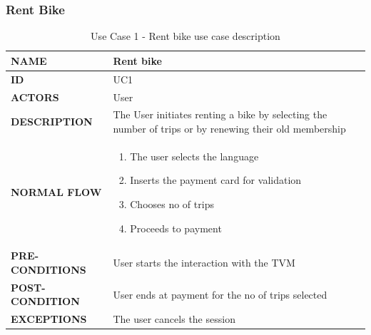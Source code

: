 \subsubsection{Rent Bike}
\begin{table}[H]
\begin{center}
\renewcommand{\arraystretch}{2}
\begin{tabular}{|p{8cm}|p{8cm}| } 
 \hline
 \textbf{NAME} & Rent bike\\ 
 \hline
 \textbf{ID} & UC1  \\ 
 \hline
 \textbf{ACTORS} & User\\ 
 \hline
 \textbf{DESCRIPTION} & The User initiates renting a bike by selecting the number of trips or by renewing their old membership \\ 
 \hline
 \textbf{NORMAL FLOW} & \begin{enumerate}
     \item The user selects the language
     \item Inserts the payment card for validation
     \item Chooses no of trips
     \item Proceeds to payment
 \end{enumerate} \\
 \hline
 \textbf{PRE-CONDITIONS} & User starts the interaction with the TVM\\
 \hline
 \textbf{POST-CONDITION} & User ends at payment for the no of trips selected\\
 \hline
 \textbf{EXCEPTIONS} & The user cancels the session\\
 \hline
\end{tabular}
\caption{\label{demo-table}Use Case 1 - Rent bike use case description}
\end{center}
\end{table}

